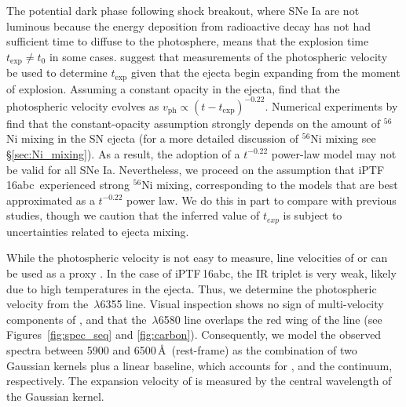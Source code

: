 \documentclass[twocolumn]{aastex61}
\newcommand{\abc}{iPTF\,16abc}
\begin{document}
The potential dark phase following shock breakout, where SNe Ia are not luminous because the energy deposition from radioactive decay has not had sufficient time to diffuse to the photosphere, means that the explosion time $t_\mathrm{exp} \ne t_0$ in some cases. \citet{2014ApJ...784...85P} suggest that measurements of the photospheric velocity be used to determine $t_\mathrm{exp}$ given that the ejecta begin expanding from the moment of explosion.  Assuming a constant opacity in the ejecta, \citeauthor{2014ApJ...784...85P} 
find that the photospheric velocity evolves as
$v_\mathrm{ph}\propto(t-t_\mathrm{exp})^{-0.22}$. Numerical experiments by \citet{2016ApJ...826...96P} find that the constant-opacity assumption strongly depends on the amount of $^{56}$Ni mixing in the SN ejecta (for a more detailed discussion of $^{56}$Ni mixing see \S\ref{sec:Ni_mixing}). As a result, the adoption of a $t^{-0.22}$ power-law model may not be valid for all SNe Ia. Nevertheless, we proceed on the assumption that \abc\ experienced strong $^{56}$Ni mixing, corresponding to the models that are best approximated as a $t^{-0.22}$ power law. We do this in part to compare with previous studies, though we caution that the inferred value of $t_{exp}$ is subject to uncertainties related to ejecta mixing. 

While the photospheric velocity
is not easy to measure, line velocities of  or 
can be used as a proxy
\citep{2014ApJ...784...85P,2016ApJ...826..144S}. In the case of \abc, the  IR triplet is very weak, 
likely due to high temperatures in the ejecta. Thus, we
determine the photospheric velocity from the 
\,$\lambda$6355 line. Visual inspection shows no 
sign of multi-velocity components of , and that 
the \,$\lambda$6580 line overlaps the red
wing of the  line (see Figures~\ref{fig:spec_seq} and \ref{fig:carbon}). Consequently, we model the observed 
spectra between 5900 and 6500\,\AA\ (rest-frame) as the 
combination of two Gaussian kernels plus a linear baseline, which
accounts for ,  and the
continuum, respectively. The expansion
velocity of  is measured by the central wavelength
of the  Gaussian kernel.
\end{document}
